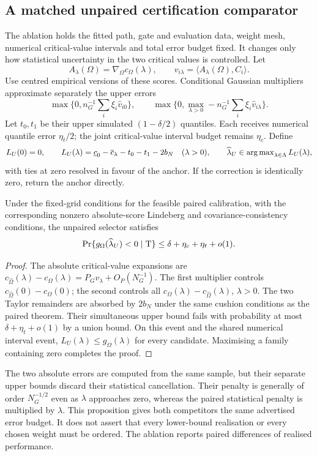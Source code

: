 \subsection{A matched unpaired certification comparator}
The ablation holds the fitted path, gate and evaluation data, weight mesh, numerical critical-value intervals and total error budget fixed. It changes only how statistical uncertainty in the two critical values is controlled. Let
\[
 A_\lambda(\Omega)=\nabla_\Omega c_\Omega(\lambda),\qquad
 v_{i\lambda}=\langle A_\lambda(\Omega),C_i\rangle.
\]
Use centred empirical versions of these scores. Conditional Gaussian multipliers approximate separately the upper errors
\[
 \max\{0,n_G^{-1}\sum_i\xi_i\widehat v_{i0}\},\qquad
 \max\{0,\max_{\lambda>0}-n_G^{-1}\sum_i\xi_i\widehat v_{i\lambda}\}.
\]
Let $t_0,t_1$ be their upper simulated $(1-\delta/2)$ quantiles. Each receives numerical quantile error $\eta_t/2$; the joint critical-value interval budget remains $\eta_c$. Define
\[
 L_U(0)=0,\qquad
 L_U(\lambda)=\underline c_0-\overline c_\lambda-t_0-t_1-2b_N
 \quad (\lambda>0),
 \qquad \widehat\lambda_U\in\operatorname{arg\,max}_{\lambda\in\Lambda}L_U(\lambda),
\]
with ties at zero resolved in favour of the anchor. If the correction is identically zero, return the anchor directly.

\begin{proposition}
Under the fixed-grid conditions for the feasible paired calibration, with the corresponding nonzero absolute-score Lindeberg and covariance-consistency conditions, the unpaired selector satisfies
\[
 \Pr\{g_\Omega(\widehat\lambda_U)<0\mid\mathrm{T}\}
 \leq\delta+\eta_c+\eta_t+o(1).
\]
\end{proposition}
\begin{proof}
The absolute critical-value expansions are
$c_{\widehat\Omega}(\lambda)-c_\Omega(\lambda)
=P_Gv_\lambda+O_P(N_G^{-1})$. The first multiplier controls $c_{\widehat\Omega}(0)-c_\Omega(0)$; the second controls all $c_\Omega(\lambda)-c_{\widehat\Omega}(\lambda)$, $\lambda>0$. The two Taylor remainders are absorbed by $2b_N$ under the same cushion conditions as the paired theorem. Their simultaneous upper bound fails with probability at most $\delta+\eta_t+o(1)$ by a union bound. On this event and the shared numerical interval event, $L_U(\lambda)\leq g_\Omega(\lambda)$ for every candidate. Maximising a family containing zero completes the proof.
\end{proof}
The two absolute errors are computed from the same sample, but their separate upper bounds discard their statistical cancellation. Their penalty is generally of order $N_G^{-1/2}$ even as $\lambda$ approaches zero, whereas the paired statistical penalty is multiplied by $\lambda$. This proposition gives both competitors the same advertised error budget. It does not assert that every lower-bound realisation or every chosen weight must be ordered. The ablation reports paired differences of realised performance.

